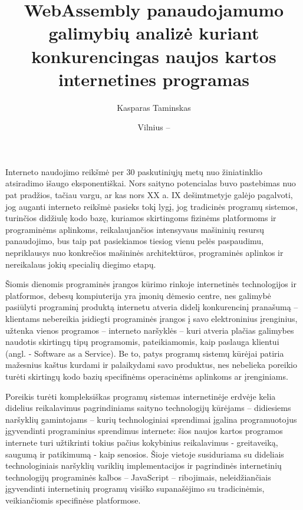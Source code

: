 \documentclass{VUMIFPSkursinis}
\title{WebAssembly panaudojamumo galimybių analizė kuriant konkurencingas naujos kartos internetines programas }
\author{Kasparas Taminskas}
\date{Vilnius – \the\year}
\begin{document}
\lstset{language=C}

\maketitle
\cleardoublepage{}
\setcounter{page}{2}

\tableofcontents

Interneto naudojimo reikšmė per 30 paskutiniųjų metų nuo žiniatinklio atsiradimo išaugo 
eksponentiškai. Nors saityno potencialas buvo pastebimas nuo pat pradžios, tačiau vargu, ar 
kas nors XX a. IX dešimtmetyje galėjo pagalvoti, jog auganti interneto reikšmė pasieks tokį 
lygį, jog tradicinės programų sistemos, turinčios didžiulę kodo bazę, kuriamos skirtingoms 
fizinėms platformoms ir programinėms aplinkoms, reikalaujančios intensyvaus mašininių resursų 
panaudojimo, bus taip pat pasiekiamos tiesiog vienu pelės paspaudimu, nepriklausys nuo 
konkrečios mašininės architektūros, programinės aplinkos ir nereikalaus jokių specialių 
diegimo etapų.

Šiomis dienomis programinės įrangos kūrimo rinkoje internetinės technologijos ir 
platformos, debesų kompiuterija yra įmonių dėmesio centre, nes galimybė pasiūlyti programinį 
produktą internetu atveria didelį konkurencinį pranašumą – klientams nebereikia įsidiegti 
programinės įrangos į savo elektroninius įrenginius, užtenka vienos programos – interneto 
naršyklės – kuri atveria plačias galimybes naudotis skirtingų tipų programomis, pateikiamomis, 
kaip paslauga klientui (angl. - Software as a Service). Be to, patys programų sistemų kūrėjai 
patiria mažesnius kaštus kurdami ir palaikydami savo produktus, nes nebelieka poreikio turėti 
skirtingų kodo bazių specifinėms operacinėms aplinkoms ar įrenginiams.

Poreikis turėti kompleksiškas programų sistemas internetinėje erdvėje kelia didelius 
reikalavimus pagrindiniams saityno technologijų kūrėjams – didiesiems naršyklių gamintojams – 
kurių technologiniai sprendimai įgalina programuotojus įgyvendinti programinius sprendimus 
internete: šios naujos kartos programos internete turi užtikrinti tokius pačius kokybinius 
reikalavimus - greitaveiką, saugumą ir patikimumą - kaip senosios. Šioje vietoje susiduriama 
su dideliais technologiniais naršyklių variklių implementacijos ir pagrindinės internetinių 
technologijų programinės kalbos – JavaScript – ribojimais, neleidžiančiais įgyvendinti 
internetinių programų visiško supanašėjimo su tradicinėmis, veikiančiomis specifinėse 
platformose. 
\end{document}
